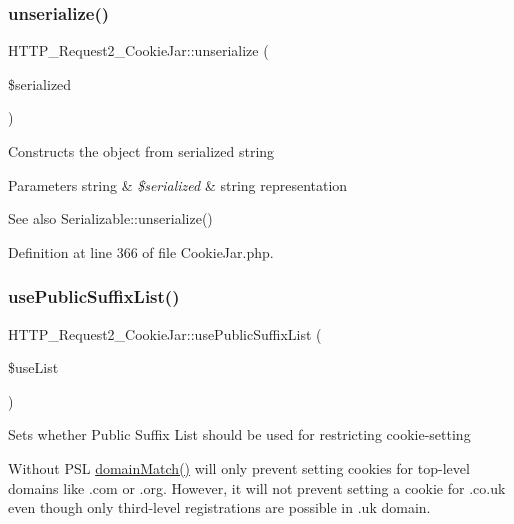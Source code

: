\subsubsection{\texorpdfstring{unserialize()}{unserialize()}}
{\footnotesize\ttfamily H\+T\+T\+P\+\_\+\+Request2\+\_\+\+Cookie\+Jar\+::unserialize (\begin{DoxyParamCaption}\item[{}]{\$serialized }\end{DoxyParamCaption})}

Constructs the object from serialized string


\begin{DoxyParams}[1]{Parameters}
string & {\em \$serialized} & string representation\\
\hline
\end{DoxyParams}
\begin{DoxySeeAlso}{See also}
Serializable\+::unserialize() 
\end{DoxySeeAlso}


Definition at line 366 of file Cookie\+Jar.\+php.

\mbox{\label{classHTTP__Request2__CookieJar_aa5754da6e9d23db800e091bc16fb3bc8}} 
\subsubsection{\texorpdfstring{use\+Public\+Suffix\+List()}{usePublicSuffixList()}}
{\footnotesize\ttfamily H\+T\+T\+P\+\_\+\+Request2\+\_\+\+Cookie\+Jar\+::use\+Public\+Suffix\+List (\begin{DoxyParamCaption}\item[{}]{\$use\+List }\end{DoxyParamCaption})}

Sets whether Public Suffix List should be used for restricting cookie-\/setting

Without P\+SL \hyperlink{classHTTP__Request2__CookieJar_ad22bee9ce6d2c111120bf44c3e302401}{domain\+Match()} will only prevent setting cookies for top-\/level domains like \textquotesingle{}.com\textquotesingle{} or \textquotesingle{}.org\textquotesingle{}. However, it will not prevent setting a cookie for \textquotesingle{}.co.\+uk\textquotesingle{} even though only third-\/level registrations are possible in .uk domain.

